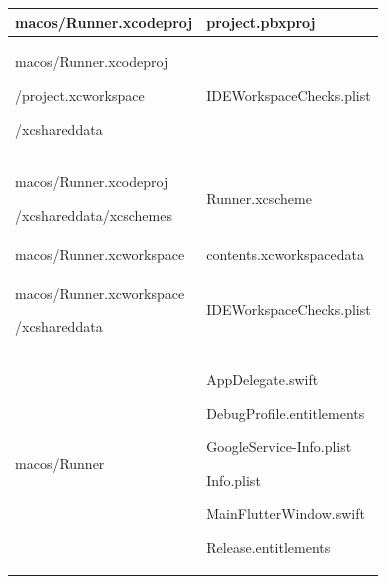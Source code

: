 \documentclass[conference]{IEEEtran}
\begin{document}
\begin{table}[h]
\begin{tabular}{|p{3.7cm}|p{4.1cm}|}
        macos/Runner.xcodeproj  & \par project.pbxproj
         \\ \hline

        macos/Runner.xcodeproj \par /project.xcworkspace \par /xcshareddata   & \par IDEWorkspaceChecks.plist
        \\ \hline

        macos/Runner.xcodeproj \par /xcshareddata/xcschemes   & \par Runner.xcscheme
        \\ \hline

        macos/Runner.xcworkspace  & \par contents.xcworkspacedata
        \\ \hline

        macos/Runner.xcworkspace \par /xcshareddata  & \par IDEWorkspaceChecks.plist
        \\ \hline

        macos/Runner \par   & \par AppDelegate.swift \par DebugProfile.entitlements \par GoogleService-Info.plist \par Info.plist \par MainFlutterWindow.swift \par Release.entitlements
         \\ \hline
        
    \end{tabular}
\end{table}
\end{document}
